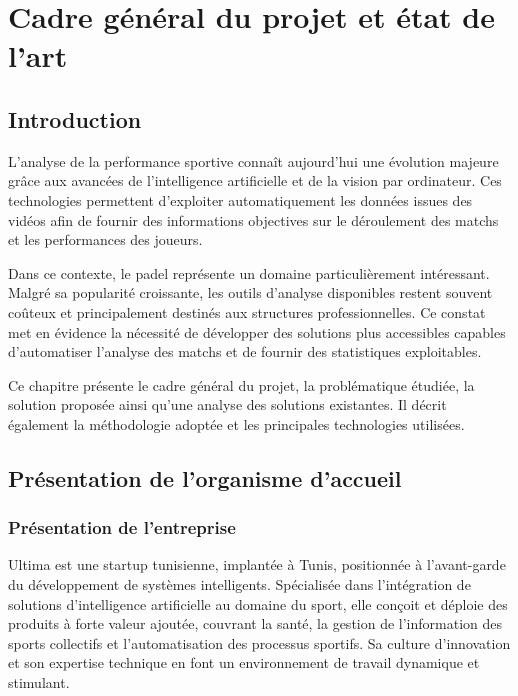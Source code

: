\chapter{Cadre général du projet et état de l’art}

\section{Introduction}

L’analyse de la performance sportive connaît aujourd’hui une évolution majeure grâce aux avancées de l’intelligence artificielle et de la vision par ordinateur. Ces technologies permettent d’exploiter automatiquement les données issues des vidéos afin de fournir des informations objectives sur le déroulement des matchs et les performances des joueurs.

Dans ce contexte, le padel représente un domaine particulièrement intéressant. Malgré sa popularité croissante, les outils d’analyse disponibles restent souvent coûteux et principalement destinés aux structures professionnelles. Ce constat met en évidence la nécessité de développer des solutions plus accessibles capables d’automatiser l’analyse des matchs et de fournir des statistiques exploitables.

Ce chapitre présente le cadre général du projet, la problématique étudiée, la solution proposée ainsi qu’une analyse des solutions existantes. Il décrit également la méthodologie adoptée et les principales technologies utilisées.

\section{Présentation de l’organisme d’accueil}

\subsection{Présentation de l’entreprise}

Ultima est une startup tunisienne, implantée à Tunis, positionnée à l’avant-garde du développement de systèmes intelligents. Spécialisée dans l’intégration de solutions d’intelligence artificielle au domaine du sport, elle conçoit et déploie des produits à forte valeur ajoutée, couvrant la santé, la gestion de l’information des sports collectifs et l’automatisation des processus sportifs. Sa culture d’innovation et son expertise technique en font un environnement de travail dynamique et stimulant.


